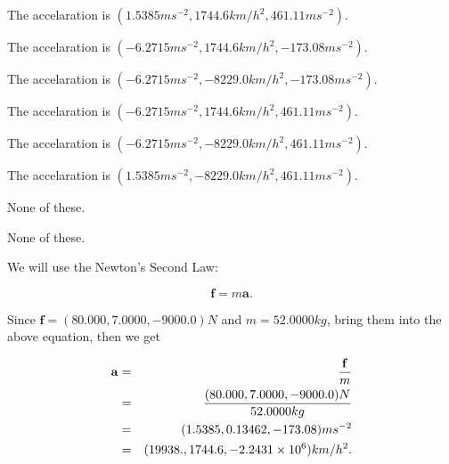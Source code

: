 \documentclass[12pt]{article}
\begin{document}
 
 
The accelaration is
$(
1.5385ms^{-2},
1744.6km/h^2,
461.11ms^{-2}
).
$
 
 
The accelaration is
$(
-6.2715ms^{-2},
1744.6km/h^2,
-173.08ms^{-2}
).
$
 
 
The accelaration is
$(
-6.2715ms^{-2},
-8229.0km/h^2,
-173.08ms^{-2}
).
$
 
 
The accelaration is
$(
-6.2715ms^{-2},
1744.6km/h^2,
461.11ms^{-2}
).
$
 
 
The accelaration is
$(
-6.2715ms^{-2},
-8229.0km/h^2,
461.11ms^{-2}
).
$
 
 
The accelaration is
$(
1.5385ms^{-2},
-8229.0km/h^2,
461.11ms^{-2}
).
$
 
 
 None of these.
 
 
\noindent{}
 
 
 None of these.
 
 
\noindent{}
 
 
 
 
 
 
\noindent{}
 
 

We will use the Newton's Second Law:
 
\[
\mathbf{f}=m\mathbf{a}.
\]
 
Since $\mathbf{f}=( %
80.000,  %
7.0000,  %
-9000.0 )N$
and $m= %
52.0000kg$, bring them into the above equation, then we get
 
\begin{eqnarray*}
\mathbf{a}&=&\frac{\mathbf{f}}m  \\
&=&\frac{(
80.000 ,
7.0000 ,
-9000.0 )N
}{ %
52.0000 kg}  \\
&=&(
1.5385 ,
0.13462,
-173.08
)ms^{-2} \\
&=&(
19938. ,
1744.6 ,
-2.2431 \times 10^{6}
)km/h^2.
\end{eqnarray*}
 
 
 
\noindent{}
 
\end{document}
